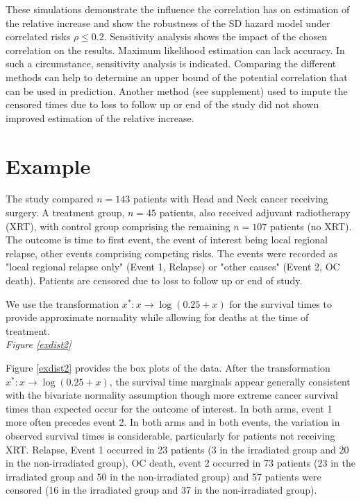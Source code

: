 \documentclass[twoside,a4paper,12pt]{article}
\theoremstyle{plain}
\theoremstyle{definition}
\begin{document}
These simulations demonstrate the influence the correlation has on estimation of the relative increase and show the robustness of the SD hazard model under  correlated risks {$\rho\leq 0.2$}. 
Sensitivity analysis shows the impact of the chosen correlation on the results. 
Maximum likelihood estimation can lack accuracy.
In such a circumstance, sensitivity analysis is indicated. 
Comparing the different methods can help to determine an upper bound of the 
potential correlation that can be used in prediction.
Another method (see supplement) used to impute the censored times due 
to loss to follow up or end of the study 
did not shown improved estimation of the relative increase.




\section{Example}\label{ex}
  The study compared $n=143$ patients with Head and Neck cancer receiving 
surgery. 
  A treatment group,  $n=45$ patients, also received adjuvant radiotherapy 
(XRT), with control group comprising the remaining $n=107$ patients (no XRT).
  The outcome is time   to first event, the event of interest being local regional 
relapse, other events comprising competing risks. 
The events were recorded as "local regional relapse only" (Event 1, Relapse) or 
"other causes" (Event 2, OC death). 
Patients are censored due to loss to follow up or end of study. 

We use the transformation $x^*:x\to\log(0.25+x)$ for the survival times to provide approximate normality
while allowing for deaths at the time of treatment.\\
  
\noindent \textit{Figure \ref{exdist2}}\\

\nocite{*}

Figure \ref{exdist2} {provides} the box plots of the data.
After the transformation $x^*:x\to\log(0.25+x)$, the survival time marginals 
appear generally consistent with the {bivariate} normality assumption 
{though} more extreme cancer survival times than expected occur for the {outcome 
of interest}. 
In both arms, event 1 more often precedes event 2. 
In both arms and in both events, the variation in %
observed survival times is considerable, particularly for patients not receiving XRT. 
Relapse, Event 1 occurred in 23 patients (3  in the irradiated group and 20 in 
the non-irradiated group), OC death, event 2 occurred in 73 patients  
(23 in the irradiated group and 50 in the non-irradiated group) and 57 patients 
were censored  (16 in the irradiated group and 37 in the non-irradiated group). 
\\
\end{document}
